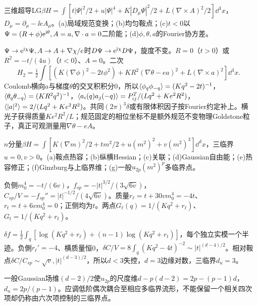 \begin{exercise}[原题10(a)--(d)]\label{r:334-1-10}
三维超导LG$\beta H=\int[t|\Psi|^2/2+u|\Psi|^4+K|D_\mu\Psi|^2/2+L(\nabla\times A)^2/2]\dd^3x$，$D_\mu=\partial_\mu-\ii eA_\mu$。(a)局域规范变换；(b)均匀鞍点；(c)$t<0$以$\Psi=(R+\phi)\mathrm e^{\mathrm i\theta},A=a,\nabla\cdot a=0$二阶能；(d)$\phi,\theta,a$的Fourier协方差。
\end{exercise}
\begin{solution}
$\Psi\to\mathrm e^{\mathrm i\chi}\Psi,A\to A+\nabla\chi/e$时$D\Psi\to\mathrm e^{\mathrm i\chi}D\Psi$，旋度不变。$R=0$（$t>0$）或$R^2=-t/(4u)$（$t<0$）、$A=0$。二次
\begin{equation}
H_2=\tfrac12\int[(K(\nabla\phi)^2-2t\phi^2)+KR^2(\nabla\theta-ea)^2+L(\nabla\times a)^2]\dd^3x.
\end{equation}
Coulomb横向$a$与梯度$\theta$的交叉积积分0，所以$\langle \phi_q\phi_{-q}\rangle=(Kq^2-2t)^{-1}$，$\langle \theta_q\theta_{-q}\rangle=(KR^2q^2)^{-1}$，$\langle a_i(q)a_j(-q)\rangle=P^T_{ij}/(Lq^2+Ke^2R^2)$，$\langle |a|^2\rangle=2/(Lq^2+Ke^2R^2)$。共同$(2\pi)^3\delta$或有限体积因子按Fourier约定补上。横光子获得质量$Ke^2R^2/L$；规范固定的相位坐标不是额外规范不变物理Goldstone粒子，真正可观测量用$\nabla\theta-eA$。
\end{solution}
\begin{exercise}[原题11(a)--(g)]\label{r:334-1-11}
$n$分量$\beta H=\int[K(\nabla m)^2/2+tm^2/2+u(m^2)^2+v(m^2)^3]\dd^dx$，三临界$u=0,v>0$。(a)鞍点热容；(b)纵横Hessian；(c)关联；(d)Gaussian自由能；(e)热容修正；(f)Ginzburg与上临界维；(g)一般$u_{2p}(m^2)^p$多临界点。
\end{exercise}
\begin{solution}
负侧$m_0^4=-t/(6v)$，$f_{sp}=-|t|^{3/2}/(3\sqrt{6v})$，$C_{sp}/V=-f_{sp}''=|t|^{-1/2}/(4\sqrt{6v})$。质量$r_\ell=t+30vm_0^4=-4t$、$r_t=t+6vm_0^4=0$；正侧均为$t$。两点$G_\ell(q)=1/(Kq^2+r_\ell)$、$G_t=1/(Kq^2+r_t)$。

$\delta f=\tfrac12\int_q[\log(Kq^2+r_\ell)+(n-1)\log(Kq^2+r_t)]$，每个独立实模一个半迹。负側$r_\ell'=-4$、横质量恒0，$\delta C/V=8\int_q(Kq^2-4t)^{-2}\sim|t|^{(d-4)/2}$。相对鞍点$\delta C/C_{sp}\sim\sqrt v,|t|^{(d-3)/2}$，所以$d<3$失控，$d=3$边缘对数，三临界$d_u=3$。

一般Gaussian场维$(d-2)/2$使$u_{2p}$的尺度维$d-p(d-2)=2p-(p-1)d$，$d_u=2p/(p-1)$。应调低阶偶次耦合至相应多临界流形，不能保留一个相关四次项却仍称由六次项控制的三临界点。
\end{solution}

